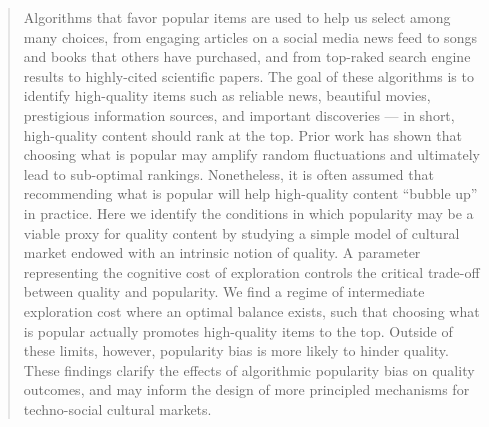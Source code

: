 \begin{abstract}
Algorithms that favor popular items are used to help us select among many choices, from engaging articles on a social media news feed to songs and books that others have purchased, and from top-raked search engine results to highly-cited scientific papers. The goal of these algorithms is to identify high-quality items such as reliable news, beautiful movies, prestigious information sources, and important discoveries --- in short, high-quality content should rank at the top.  
Prior work has shown that choosing what is popular may amplify random fluctuations and ultimately lead to sub-optimal rankings. Nonetheless, it is often assumed that recommending what is popular will help high-quality content ``bubble up'' in practice. Here we identify the conditions in which popularity may be a viable proxy for quality content by studying a simple model of cultural market endowed with an intrinsic notion of quality. A parameter representing the cognitive cost of exploration controls the critical trade-off between quality and popularity.  We find a regime of intermediate exploration cost where an optimal balance exists, such that choosing what is popular actually promotes high-quality items to the top. Outside of these limits, however, popularity bias is more likely to hinder quality. 
These findings clarify the effects of algorithmic popularity bias on quality outcomes, and may inform the design of more principled mechanisms for techno-social cultural markets.
\end{abstract}